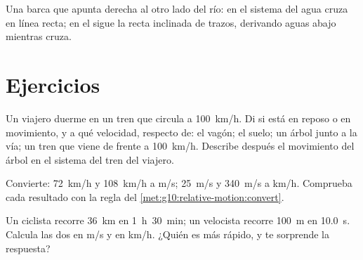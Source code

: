 \begin{omfigure}

{\small Una barca que apunta derecha al otro lado del río: en el sistema
del agua cruza en línea recta; en el  sigue la recta
inclinada de trazos, derivando aguas abajo mientras cruza.}
\end{omfigure}

\section{Ejercicios}

\begin{exercise}[$\star$]\label{exo:g10:relative-motion:1}
Un viajero duerme en un tren que circula a \qty{100}{km/h}. Di si está
en reposo o en movimiento, y a qué velocidad, respecto de: el vagón; el
suelo; un árbol junto a la vía; un tren que viene de frente a
\qty{100}{km/h}. Describe después el movimiento del árbol en el sistema
del tren del viajero.
\end{exercise}

\begin{exercise}[$\star$]\label{exo:g10:relative-motion:2}
Convierte: \qty{72}{km/h} y \qty{108}{km/h} a \unit{m/s};
\qty{25}{m/s} y \qty{340}{m/s} a \unit{km/h}. Comprueba cada resultado
con la regla del \cref{met:g10:relative-motion:convert}.
\end{exercise}

\begin{exercise}[$\star$]\label{exo:g10:relative-motion:3}
Un ciclista recorre \qty{36}{km} en \qty{1}{h}~\qty{30}{min}; un
velocista recorre \qty{100}{m} en \qty{10.0}{s}. Calcula las dos
 en \unit{m/s} y en \unit{km/h}. ¿Quién es más rápido,
y te sorprende la respuesta?
\end{exercise}

